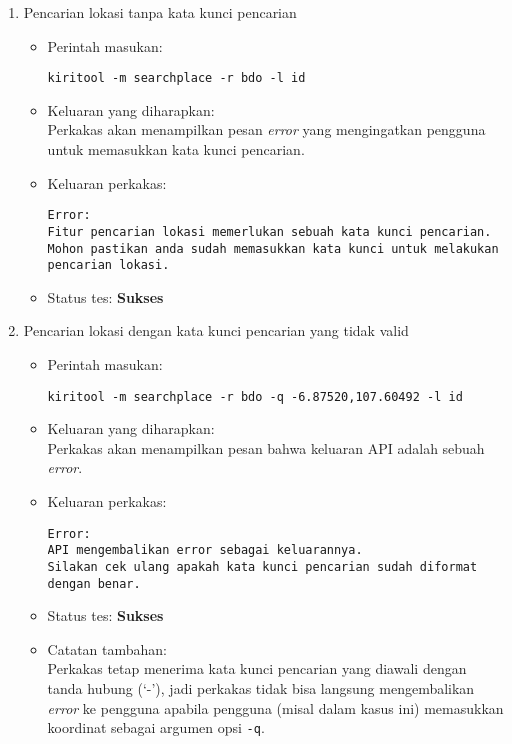 \begin{enumerate}
	\item Pencarian lokasi tanpa kata kunci pencarian
	\begin{itemize}
		\item Perintah masukan:
		\begin{verbatim}
kiritool -m searchplace -r bdo -l id
		\end{verbatim}
		\item Keluaran yang diharapkan: \\
		Perkakas akan menampilkan pesan \textit{error} yang mengingatkan pengguna untuk memasukkan kata kunci pencarian.
		\item Keluaran perkakas:
		\begin{lstlisting}
Error:
Fitur pencarian lokasi memerlukan sebuah kata kunci pencarian.
Mohon pastikan anda sudah memasukkan kata kunci untuk melakukan pencarian lokasi.
		\end{lstlisting}
		\item Status tes: \textbf{Sukses}
	\end{itemize}
	
	\item Pencarian lokasi dengan kata kunci pencarian yang tidak valid
	\begin{itemize}
		\item Perintah masukan:
		\begin{verbatim}
kiritool -m searchplace -r bdo -q -6.87520,107.60492 -l id
		\end{verbatim}
		\item Keluaran yang diharapkan: \\
		Perkakas akan menampilkan pesan bahwa keluaran API adalah sebuah \textit{error}.
		\item Keluaran perkakas:
		\begin{lstlisting}
Error:
API mengembalikan error sebagai keluarannya.
Silakan cek ulang apakah kata kunci pencarian sudah diformat dengan benar.
		\end{lstlisting}
		\item Status tes: \textbf{Sukses}
		\item Catatan tambahan: \\
		Perkakas tetap menerima kata kunci pencarian yang diawali dengan tanda hubung (`-'), jadi perkakas tidak bisa langsung mengembalikan \textit{error} ke pengguna apabila pengguna (misal dalam kasus ini) memasukkan koordinat \latlon sebagai argumen opsi \verb|-q|.
	\end{itemize}
	

\end{enumerate}
